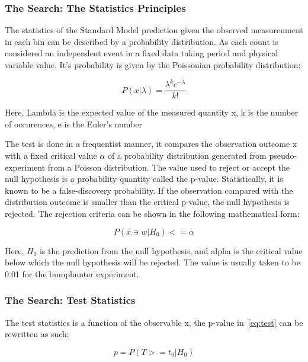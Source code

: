 \subsubsection{The Search: The Statistics Principles}

The statistics of the Standard Model prediction given the observed measurenment in each bin can be described by a probability distribution. As each count is considered an independent event in a fixed data taking period and physical variable value. It's probability is given by the Poissonian probability distribution:

\begin{equation}
 P(x|\lambda) = \frac{\lambda^{k}e^{-\lambda}}{k!} 
 \label{eq:Poissonian}
\end{equation}

Here, Lambda is the expected value of the measured quantity x, k is the number of occurences, e is the Euler's number  

    The test is done in a frequentist manner, it compares the observation outcome x with a fixed critical value $\alpha$ of a probability distribution generated from pseudo-experiment from a Poisson distribution. The value used to reject or accept the null hypothesis is a probability quantity called the p-value. Statistically, it is known to be a false-discovery probability. 
    If the observation compared with the distribution outcome is smaller than the critical p-value, the null hypothesis is rejected. The rejection criteria can be shown in the following mathematical form:

\begin{equation}
    P(x \ni w|H_0)<= \alpha 
    \label{eq:test}
\end{equation}


Here, $H_0$ is the prediction from the null hypothesis, and alpha is the critical value below which the null hypothesis will be rejected. The value is usually taken to be 0.01 for the bumphunter experiment. 

\subsubsection{The Search: Test Statistics}
\label{teststatistics}

The test statistics is a function of the observable x, the p-value in~\ref{eq:test} can be rewritten as such:
    
\begin{equation}
    p = P(T>=t_{0}| H_{0})
\label{eq:p-valuetestStats}
\end{equation}

